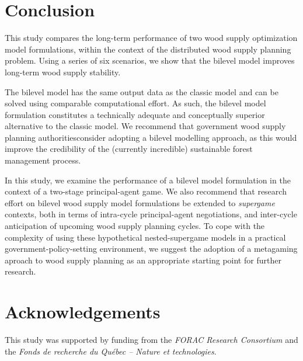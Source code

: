 

\section{Conclusion}
\label{sec:conclusion3}

This study compares the long-term performance of two wood supply optimization model formulations, within the context of the distributed wood supply planning problem. Using a series of six scenarios, we show that the bilevel model improves long-term wood supply stability. 

The bilevel model has the same output data as the classic model and can be solved using comparable computational effort. As such, the bilevel model formulation constitutes a technically adequate and conceptually superior alternative to the classic model.  We recommend that government wood supply planning authoritiesconsider adopting a bilevel modelling approach, as this would improve the credibility of the (currently incredible) sustainable forest management process. 

In this study, we examine the performance of a bilevel model formulation in the context of a two-stage principal-agent game. We also recommend that research effort on bilevel wood supply model formulations be extended to \emph{supergame} contexts, both in terms of intra-cycle principal-agent negotiations, and inter-cycle anticipation of upcoming wood supply planning cycles. To cope with the complexity of using these hypothetical nested-supergame models in a practical government-policy-setting environment, we suggest the adoption of a metagaming aproach to wood supply planning as an appropriate starting point for further research. 

\section{Acknowledgements}
\label{sec:acknowledgements3}

This study was supported by funding from the \emph{FORAC Research
  Consortium} and the \emph{Fonds de recherche du Qu\'{e}bec -- Nature
  et technologies}. 


